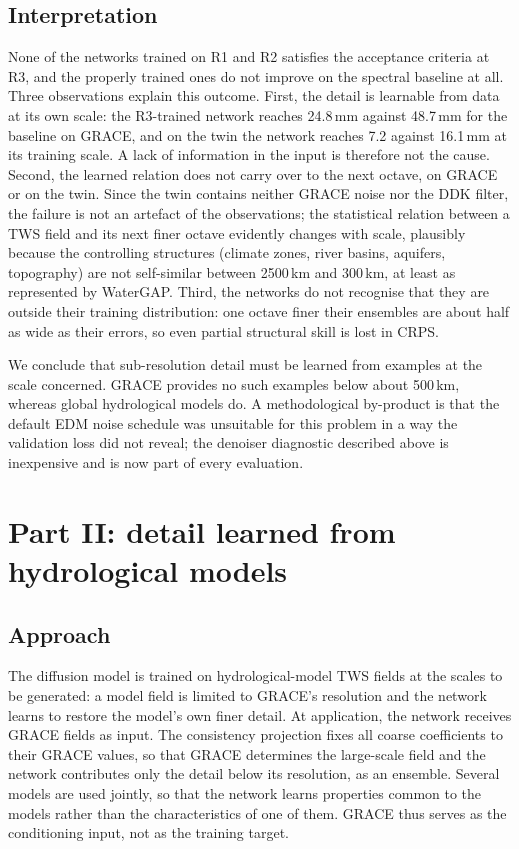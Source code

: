 \documentclass[11pt,a4paper]{article}
\begin{document}
\subsection{Interpretation}
None of the networks trained on R1 and R2 satisfies the acceptance criteria at R3, and the
properly trained ones do not improve on the spectral baseline at all. Three observations explain
this outcome. First, the detail is learnable from data at its own scale: the R3-trained network
reaches 24.8\,mm against 48.7\,mm for the baseline on GRACE, and on the twin the network reaches
7.2 against 16.1\,mm at its training scale. A lack of information in the input is therefore not
the cause. Second, the learned relation does not carry over to the next octave, on GRACE or on
the twin. Since the twin contains neither GRACE noise nor the DDK filter, the failure is not an
artefact of the observations; the statistical relation between a TWS field and its next finer
octave evidently changes with scale, plausibly because the controlling structures (climate
zones, river basins, aquifers, topography) are not self-similar between 2500\,km and 300\,km, at
least as represented by WaterGAP. Third, the networks do not recognise that they are outside
their training distribution: one octave finer their ensembles are about half as wide as their
errors, so even partial structural skill is lost in CRPS.

We conclude that sub-resolution detail must be learned from examples at the scale concerned.
GRACE provides no such examples below about 500\,km, whereas global hydrological models do. A
methodological by-product is that the default EDM noise schedule was unsuitable for this
problem in a way the validation loss did not reveal; the denoiser diagnostic described above is
inexpensive and is now part of every evaluation.

\section{Part II: detail learned from hydrological models}\label{sec:part2}

\subsection{Approach}
The diffusion model is trained on hydrological-model TWS fields at the scales to be generated:
a model field is limited to GRACE's resolution and the network learns to restore the model's own
finer detail. At application, the network receives GRACE fields as input. The consistency
projection fixes all coarse coefficients to their GRACE values, so that GRACE determines the
large-scale field and the network contributes only the detail below its resolution, as an
ensemble. Several models are used jointly, so that the network learns properties common to the
models rather than the characteristics of one of them. GRACE thus serves as the conditioning
input, not as the training target.
\end{document}

